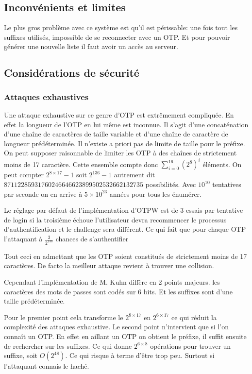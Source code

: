 \documentclass{../res/univ-projet}
\begin{document}
\subsection{Inconvénients et limites}
        Le plus gros problème avec ce système est qu'il est périssable: une fois tout les
    suffixes utilisés, impossible de se reconnecter avec un OTP. Et pour pouvoir générer
    une nouvelle liste il faut avoir un accès au serveur.

\subsection{Considérations de sécurité}
\subsubsection{Attaques exhaustives} %
        Une attaque exhaustive sur ce genre d'OTP est extrêmement compliquée.
    En effet la longueur de l'OTP en lui même est inconnue. Il s'agit d'une
    concaténation d'une chaîne de caractères de taille variable et d'une chaîne
    de caractère de longueur prédéterminée. Il n'existe a priori pas de limite
    de taille pour le préfixe. On peut supposer raisonnable de limiter les
    OTP à des chaînes de strictement moins de 17 caractère.
    Cette ensemble compte donc $\sum_{i=0}^{16}(2^8)^i$ éléments.
    On peut compter  $2^{8\times 17} - 1$ soit $2^{136} -1$ autrement dit
    $87112285931760246646623899502532662132735$ possibilités. Avec $10^{10}$ tentatives
    par seconde on en arrive à $5\times 10^{23}$ années pour tous les énumérer.

        Le réglage par défaut de l'implémentation d'OTPW est de 3 essais par tentative de login
    si la troisième échoue l'utilisateur devra recommencer le processus d'authentification
    et le challenge sera différent. Ce qui fait que pour chaque OTP l'attaquant à $\frac{3}{2^{136}}$
    chances de s'authentifier

        Tout ceci en admettant que les OTP soient constitués de strictement moins
    de 17 caractères. De facto la meilleur attaque revient à trouver une collision.
    
        Cependant l'implémentation de M. Kuhn diffère en 2 points majeurs. les caractères des mots
    de passes sont codés sur 6 bits. Et les suffixes sont d'une taille prédéterminée.
    
        Pour le premier point cela transforme le $2^{8\times 17}$ en $2^{6\times 17}$ ce qui réduit
    la complexité des attaques exhaustive. Le second point n'intervient que si l'on connaît un OTP.
    En effet en aillant un OTP on obtient le préfixe, il suffit ensuite de rechercher sur les suffixes.
    Ce qui donne $2^{6\times 8}$ opérations pour trouver un suffixe, soit $O(2^{48})$. Ce qui risque à terme
    d'être trop peu. Surtout si l'attaquant connais le haché.
\end{document}
